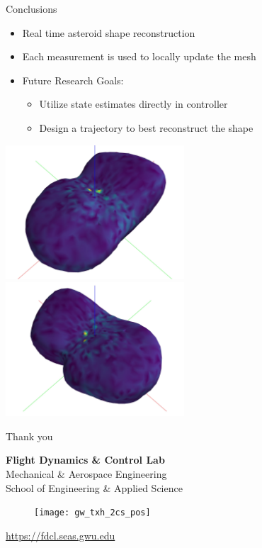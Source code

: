 \documentclass[11pt,professionalfonts]{beamer}
\begin{document}
\begin{frame}{Conclusions}
    \begin{itemize}
        \item Real time asteroid shape reconstruction 
        \item Each measurement is used to locally update the mesh
        \item Future Research Goals:
            \begin{itemize}
                \item Utilize state estimates directly in controller
                \item Design a trajectory to best reconstruct the shape
            \end{itemize}
    \end{itemize} 

    \begin{center}
        \includegraphics[width=0.5\textwidth,keepaspectratio]{figures/castalia/final_az=45_el=30.jpg}~
        \includegraphics[width=0.5\textwidth, keepaspectratio]{figures/castalia/final_az=315_el=30.jpg}
    \end{center}
\end{frame}

\begin{frame}[c]{Thank you}
  \centering
  
  \textbf{\large Flight Dynamics \& Control Lab} \\
  Mechanical \& Aerospace Engineering \\
  School of Engineering \& Applied Science
  
  \begin{figure} %
        \texttt{[image: gw\_txh\_2cs\_pos]}
    \end{figure}
  
  \url{https://fdcl.seas.gwu.edu}
\end{frame}
\end{document}
